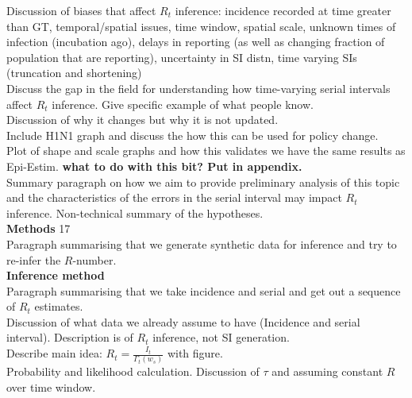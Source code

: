 \documentclass[10pt,journal,compsoc]{IEEEtran}
\begin{document}
Discussion of biases that affect $R_t$ inference: incidence recorded at time greater than GT, temporal/spatial issues, time window, spatial scale, unknown times of infection (incubation ago), delays in reporting (as well as changing fraction of population that are reporting), uncertainty in SI distn, time varying SIs (truncation and shortening)\\

Discuss the gap in the field for understanding how time-varying serial intervals affect $R_t$ inference. Give specific example of what people know.\\

Discussion of why it changes but why it is not updated.\\

Include H1N1 graph and discuss the how this can be used for policy change.\\

Plot of shape and scale graphs and how this validates we have the same results as Epi-Estim. \textbf{what to do with this bit? Put in appendix.}\\

Summary paragraph on how we aim to provide preliminary analysis of this topic and the characteristics of the errors in the serial interval may impact $R_t$ inference. Non-technical summary of the hypotheses.\\



\textbf{Methods} 17 \\

Paragraph summarising that we generate synthetic data for inference and try to re-infer the $R$-number.\\

\textbf{Inference method}\\ 

Paragraph summarising that we take incidence and serial and get out a sequence of $R_t$ estimates.\\

Discussion of what data we already assume to have (Incidence and serial interval). Description is of $R_t$ inference, not SI generation.\\

Describe main idea: $R_t = \frac{I_t}{\Gamma_t(w_s)}$ with figure.\\

Probability and likelihood calculation. Discussion of $\tau$ and assuming constant $R$ over time window.\\
\end{document}

